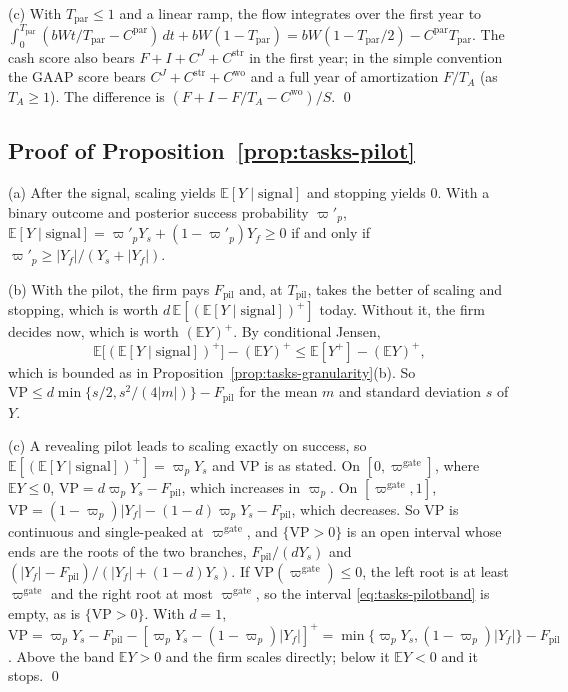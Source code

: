 (c) With $T_{\mathrm{par}}\le 1$ and a linear ramp, the flow integrates over the first year to $\int_0^{T_{\mathrm{par}}}(bWt/T_{\mathrm{par}}-C^{\mathrm{par}})\,dt+bW(1-T_{\mathrm{par}})=bW(1-T_{\mathrm{par}}/2)-C^{\mathrm{par}}T_{\mathrm{par}}$. The cash score also bears $F+I+C^J+C^{\mathrm{str}}$ in the first year; in the simple convention the GAAP score bears $C^J+C^{\mathrm{str}}+C^{\mathrm{wo}}$ and a full year of amortization $F/T_A$ (as $T_A\ge 1$). The difference is $(F+I-F/T_A-C^{\mathrm{wo}})/S$. \qed

\subsection*{Proof of Proposition~\ref{prop:tasks-pilot}}

(a) After the signal, scaling yields $\mathbb E[Y\mid\text{signal}]$ and stopping yields $0$. With a binary outcome and posterior success probability $\varpi'_p$, $\mathbb E[Y\mid\text{signal}]=\varpi'_pY_s+(1-\varpi'_p)Y_f\ge 0$ if and only if $\varpi'_p\ge|Y_f|/(Y_s+|Y_f|)$.

(b) With the pilot, the firm pays $F_{\mathrm{pil}}$ and, at $T_{\mathrm{pil}}$, takes the better of scaling and stopping, which is worth $d\,\mathbb E[(\mathbb E[Y\mid\text{signal}])^+]$ today. Without it, the firm decides now, which is worth $(\mathbb E Y)^+$. By conditional Jensen,
\[
\mathbb E\bigl[(\mathbb E[Y\mid\text{signal}])^+\bigr]-(\mathbb EY)^+\le\mathbb E[Y^+]-(\mathbb EY)^+,
\]
which is bounded as in Proposition~\ref{prop:tasks-granularity}(b). So $\mathrm{VP}\le d\min\{s/2,s^2/(4|m|)\}-F_{\mathrm{pil}}$ for the mean $m$ and standard deviation $s$ of $Y$.

(c) A revealing pilot leads to scaling exactly on success, so $\mathbb E[(\mathbb E[Y\mid\text{signal}])^+]=\varpi_pY_s$ and $\mathrm{VP}$ is as stated. On $[0,\varpi^{\mathrm{gate}}]$, where $\mathbb EY\le 0$, $\mathrm{VP}=d\varpi_pY_s-F_{\mathrm{pil}}$, which increases in $\varpi_p$. On $[\varpi^{\mathrm{gate}},1]$, $\mathrm{VP}=(1-\varpi_p)|Y_f|-(1-d)\varpi_pY_s-F_{\mathrm{pil}}$, which decreases. So $\mathrm{VP}$ is continuous and single-peaked at $\varpi^{\mathrm{gate}}$, and $\{\mathrm{VP}>0\}$ is an open interval whose ends are the roots of the two branches, $F_{\mathrm{pil}}/(dY_s)$ and $(|Y_f|-F_{\mathrm{pil}})/(|Y_f|+(1-d)Y_s)$. If $\mathrm{VP}(\varpi^{\mathrm{gate}})\le 0$, the left root is at least $\varpi^{\mathrm{gate}}$ and the right root at most $\varpi^{\mathrm{gate}}$, so the interval \eqref{eq:tasks-pilotband} is empty, as is $\{\mathrm{VP}>0\}$. With $d=1$, $\mathrm{VP}=\varpi_pY_s-F_{\mathrm{pil}}-[\varpi_pY_s-(1-\varpi_p)|Y_f|]^+=\min\{\varpi_pY_s,(1-\varpi_p)|Y_f|\}-F_{\mathrm{pil}}$. Above the band $\mathbb EY>0$ and the firm scales directly; below it $\mathbb EY<0$ and it stops. \qed

